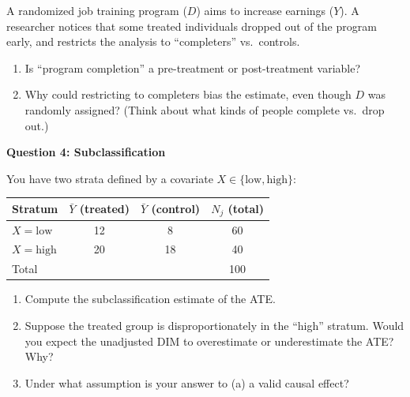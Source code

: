\documentclass[11pt]{article}
\begin{document}
\medskip
\noindent A randomized job training program ($D$) aims to increase earnings ($Y$).  A researcher notices that some treated individuals dropped out of the program early, and restricts the analysis to ``completers'' vs.\ controls.

\begin{enumerate}[label=(\alph*)]
\item Is ``program completion'' a pre-treatment or post-treatment variable?

\vspace{1cm}

\item Why could restricting to completers bias the estimate, even though $D$ was randomly assigned?  (Think about what kinds of people complete vs.\ drop out.)

\vspace{2.5cm}

\end{enumerate}


\noindent\textbf{Question 4: Subclassification}

\medskip
\noindent You have two strata defined by a covariate $X \in \{\text{low}, \text{high}\}$:

\begin{center}
\begin{tabular}{@{} l c c c @{}}
\toprule
Stratum & $\bar Y$ (treated) & $\bar Y$ (control) & $N_j$ (total) \\
\midrule
$X = \text{low}$  & 12 & 8 & 60 \\
$X = \text{high}$ & 20 & 18 & 40 \\
\midrule
Total & & & 100 \\
\bottomrule
\end{tabular}
\end{center}

\begin{enumerate}[label=(\alph*)]
\item Compute the subclassification estimate of the ATE.

\vspace{2cm}

\item Suppose the treated group is disproportionately in the ``high'' stratum.  Would you expect the unadjusted DIM to overestimate or underestimate the ATE?  Why?

\vspace{2.5cm}

\item Under what assumption is your answer to (a) a valid causal effect?

\vspace{2cm}
\end{enumerate}
\end{document}
